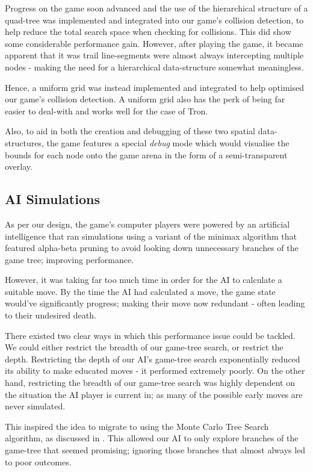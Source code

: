 \documentclass{standalone}
\begin{document}
			Progress on the game soon advanced and the use of the hierarchical structure of a quad-tree was implemented and integrated into our game's collision detection, to help reduce the total search space when checking for collisions. This did show some considerable performance gain. However, after playing the game, it became apparent that it was trail line-segments were almost always intercepting multiple nodes - making the need for a hierarchical data-structure somewhat meaningless.

			Hence, a uniform grid was instead implemented and integrated to help optimised our game's collision detection. A uniform grid also has the perk of being far easier to deal-with and works well for the case of Tron.

			Also, to aid in both the creation and debugging of these two spatial data-structures, the game features a special \emph{debug} mode which would visualise the bounds for each node onto the game arena in the form of a semi-transparent overlay.

		\subsection{AI Simulations}
			As per our design, the game's computer players were powered by an artificial intelligence that ran simulations using a variant of the minimax algorithm \parencite{minimax} that featured alpha-beta pruning \parencite{alphaBeta} to avoid looking down unnecessary branches of the game tree; improving performance.

			However, it was taking far too much time in order for the AI to calculate a suitable move. By the time the AI had calculated a move, the game state would've significantly progress; making their move now redundant - often leading to their undesired death.

			There existed two clear ways in which this performance issue could be tackled. We could either restrict the breadth of our game-tree search, or restrict the depth. Restricting the depth of our AI's game-tree search exponentially reduced its ability to make educated moves - it performed extremely poorly. On the other hand, restricting the breadth of our game-tree search was highly dependent on the situation the AI player is current in; as many of the possible early moves are never simulated.

			This inspired the idea to migrate to using the Monte Carlo Tree Search algorithm, as discussed in . This allowed our AI to only explore branches of the game-tree that seemed promising; ignoring those branches that almost always led to poor outcomes.
\end{document}
